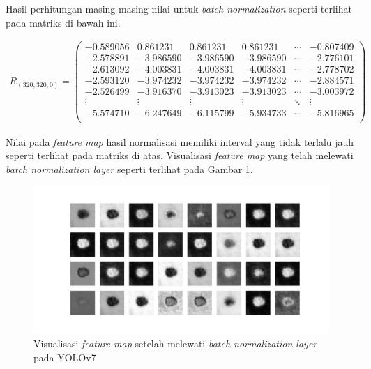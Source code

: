     Hasil perhitungan masing-masing nilai untuk \textit{batch normalization} seperti terlihat pada matriks di bawah ini.

    \begin{align*}
        R_{(320, 320, 0)} = 
        \begin{pmatrix}
            -0.589056 & 0.861231  & 0.861231  & 0.861231  & \cdots & -0.807409 \\
            -2.578891 & -3.986590 & -3.986590 & -3.986590 & \cdots & -2.776101 \\
            -2.613092 & -4.003831 & -4.003831 & -4.003831 & \cdots & -2.778702 \\
            -2.593120 & -3.974232 & -3.974232 & -3.974232 & \cdots & -2.884571 \\
            -2.526499 & -3.916370 & -3.913023 & -3.913023 & \cdots & -3.003972 \\
            \vdots    & \vdots    & \vdots    & \vdots    & \ddots & \vdots \\
            -5.574710 & -6.247649 & -6.115799 & -5.934733 & \cdots & -5.816965 \\
        \end{pmatrix}
    \end{align*}

    Nilai pada \textit{feature map} hasil normalisasi memiliki interval yang tidak terlalu jauh seperti terlihat pada matriks di atas. Visualisasi \textit{feature map} yang telah melewati \textit{batch normalization layer} seperti terlihat pada Gambar \ref{fig:d-banorm}.

    \begin{figure}[H]
        \begin{center}
            \includegraphics[width=12cm]{img/bab4/bn-layer.png}
            \caption{Visualisasi \textit{feature map} setelah melewati \textit{batch normalization layer} pada YOLOv7}
            \label{fig:d-banorm}
        \end{center}
    \end{figure}

